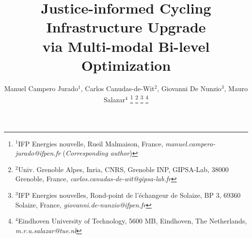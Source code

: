 \documentclass[lettersize,journal]{IEEEtran}
\begin{document}
\title{Justice-informed Cycling Infrastructure Upgrade\\
via Multi-modal Bi-level Optimization}

\author{Manuel Campero Jurado$^{1}$, Carlos Canudas-de-Wit$^{2}$, Giovanni De Nunzio$^{3}$, Mauro Salazar$^{4}$%
\thanks{$^{1}$IFP Energies nouvelle, Rueil Malmaison, France, {\footnotesize \textit{manuel.campero-jurado@ifpen.fr}} (\textit{Corresponding author})}
\thanks{$^{2}$Univ. Grenoble Alpes, Inria, CNRS, Grenoble INP, GIPSA-Lab, 38000 Grenoble, France,
        {\footnotesize \textit{carlos.canudas-de-wit@gipsa-lab.fr}}}%
\thanks{$^{3}$IFP Energies nouvelles,
Rond-point de l’échangeur de Solaize, BP 3, 69360 Solaize, France,
        {\footnotesize \textit{giovanni.de-nunzio@ifpen.fr}}}%
\thanks{$^{4}$Eindhoven University of Technology, 5600 MB, Eindhoven, The Netherlands,
{\footnotesize \textit{m.r.u.salazar@tue.nl}}}%
}





\maketitle
\end{document}
